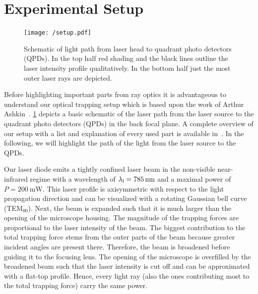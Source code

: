 \section{Experimental Setup}

\begin{figure}[tbp]
  \centering
  \texttt{[image: /setup.pdf]}
  \caption{Schematic of light path from laser head to quadrant photo detectors 
  (QPDs). In the top half red shading and the black lines outline the laser 
intensity profile qualitatively. In the bottom half just the most outer laser 
rays are depicted.}
  \label{fig:TO-setup}
\end{figure}

Before highlighting important parts from ray optics it is advantageous to 
understand our optical trapping setup which is based upon the work of Arthur 
Ashkin~\cite{Ashkin1978,Ashkin1987,Ashkin2002,Ashkin1986,Ashkin1992,Ashkin1997}. 
\cref{fig:TO-setup} depicts a basic schematic of the laser path from the laser 
source to the quadrant photo detectors (QPDs) in the back focal plane. A 
complete overview of our setup with a list and explanation of every used part 
is available in~\cite{Lamprecht2017}. In the following, we will highlight the 
path of the light from the laser source to the QPDs.

Our laser diode emits a tightly confined laser beam in the non-visible 
near-infrared regime with a wavelength of $\lal=\SI{785}{\nm}$ and a maximal 
power of $P=\SI{200}{\milli\watt}$. This laser profile is axisymmetric with 
respect to the light propagation direction and can be visualized with a 
rotating Gaussian bell curve (TEM$_{00}$). Next, the beam is expanded such 
that it is much larger than the opening of the microscope housing. The 
magnitude of the trapping forces are proportional to the laser intensity of the 
beam. The biggest contribution to the total trapping force stems from the outer 
parts of the beam because greater incident angles are present there. Therefore, 
the beam is broadened before guiding it to the focusing lens. The opening of 
the microscope is overfilled by the broadened beam such that the laser 
intensity is cut off and can be approximated with a flat-top profile. Hence, 
every light ray (also the ones contributing most to the total trapping force) 
carry the same power.

